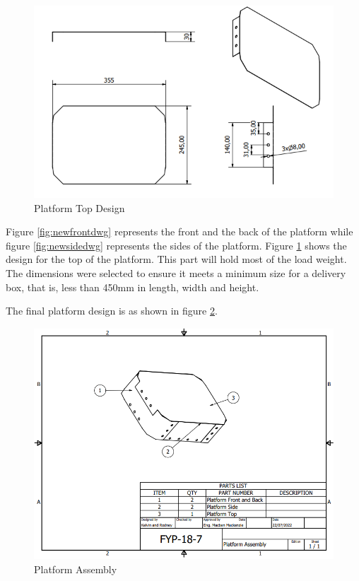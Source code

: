 \begin{figure}[H]
    \centering
    \includegraphics[scale = 0.9]{Figures/NewTopDWG.png}
    \caption{Platform Top Design}
    \label{fig:newtopdwg}
\end{figure}

Figure \ref{fig:newfrontdwg} represents the front and the back of the platform while figure \ref{fig:newsidedwg} represents the sides of the platform. Figure \ref{fig:newtopdwg} shows the design for the top of the platform. This part will hold most of the load weight. The dimensions were selected to ensure it meets a minimum size for a delivery box, that is, less than 450mm in length, width and height.

The final platform design is as shown in figure \ref{fig:platformdesign}.

\begin{figure}[H]
    \centering
    \includegraphics[scale = 0.8]{Figures/NewRedesignAssemblyParts.png}
    \caption{Platform Assembly}
    \label{fig:platformdesign}
\end{figure}

